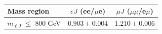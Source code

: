 \begin{table}[htp]
  \label{tab:emu_tf_boosted_perchannel_RunIII2024Summer24}
  \centering
  \begin{tabular}{l | c c}
    \hline
    Mass region & $eJ$ (ee/$\mu$e) & $\mu J$ ($\mu\mu$/e$\mu$) \\
    \hline
    $m_{\ell J}$ $\leq$ 800 GeV & $0.903 \pm 0.004$ & $1.210 \pm 0.006$ \\
    \hline
  \end{tabular}
\end{table}
